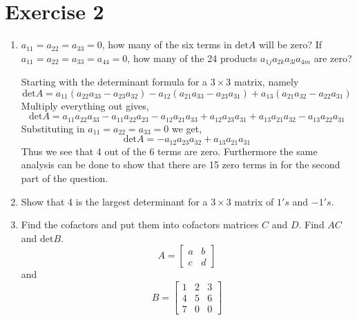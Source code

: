 \section{Exercise 2}
\begin{enumerate}[label=\arabic*.]
    \item $a_{11} = a_{22} = a_{33} =0 $, how many of the six terms in
        $\text{det} A$ will be zero? If $a_{11} = a_{22} = a_{33} = a_{44}
        = 0 $, how many of the 24 products $a_{1j}a_{2k}a_{3l}a_{4m}$ are
        zero?
        \begin{mdframed}[style=MyFrame]
            Starting with the determinant formula for a $3 \times 3$
            matrix, namely
            \begin{equation}
                \text{det}A =
                    a_{11}(a_{22}a_{33} - a_{23}a_{32})
                    -a_{12}(a_{21} a_{33} - a_{23}a_{31})
                    + a_{13}(a_{21}a_{32} -a_{22}a_{31})
            \end{equation}
            Multiply everything out gives,
            \begin{equation}
                \text{det}A = 
                    a_{11}a_{22}a_{33} 
                    -a_{11}a_{22}a_{23}  
                    -a_{12}a_{21}a_{33}  
                    +a_{12}a_{23}a_{31}  
                    +a_{13}a_{21}a_{32}  
                    -a_{13}a_{22}a_{31}  
            \end{equation}
            Substituting in $a_{11} = a_{22} = a_{33} =0 $ we get,
            \begin{equation}
                \text{det}A = 
                    -a_{12}a_{23}a_{32} + a_{13}a_{21}a_{31}
            \end{equation}
            Thus we see that 4 out of the 6 terms are zero. Furthermore the
            same analysis can be done to show that there are 15 zero terms
            in for the second part of the question. 
        \end{mdframed}


                
    \item Show that 4 is the largest determinant for a $3 \times 3$ matrix
        of $1's$ and $-1's$.

    \item Find the cofactors and put them into cofactors matrices $C$ and
        $D$. Find $AC$ and $\text{det}B$.
        \begin{equation}
          A = 
          \begin{bmatrix}
            a & b \\
            c & d
           \end{bmatrix}
        \end{equation}
        and 
        \begin{equation}
            B = 
            \begin{bmatrix}
                1 & 2 & 3 \\
                4 & 5 & 6 \\
                7 & 0 & 0
            \end{bmatrix}
        \end{equation}


\end{enumerate}

